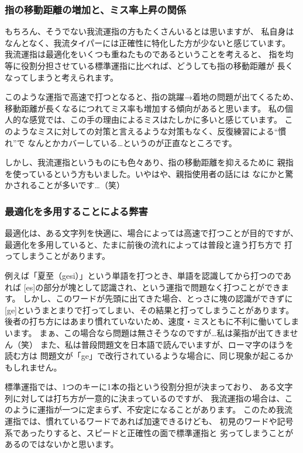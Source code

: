 \subsubsection*{指の移動距離の増加と、ミス率上昇の関係}

もちろん、そうでない我流運指の方もたくさんいるとは思いますが、
私自身はなんとなく、我流タイパーには正確性に特化した方が少ないと感じています。
我流運指は最適化をいくつも重ねたものであるということを考えると、
指を均等に役割分担させている標準運指に比べれば、どうしても指の移動距離が
長くなってしまうと考えられます。

このような運指で高速で打つとなると、指の跳躍→着地の問題が出てくるため、
移動距離が長くなるにつれてミス率も増加する傾向があると思います。
私の個人的な感覚では、この手の理由によるミスはたしかに多いと感じています。
このようなミスに対しての対策と言えるような対策もなく、反復練習による“慣れ”で
なんとかカバーしている…というのが正直なところです。


しかし、我流運指というものにも色々あり、指の移動距離を抑えるために
親指を使っているという方もいました。いやはや、親指使用者の話には
なにかと驚かされることが多いです…（笑）


\subsubsection*{最適化を多用することによる弊害}

最適化は、ある文字列を快適に、場合によっては高速で打つことが目的ですが、
最適化を多用していると、たまに前後の流れによっては普段と違う打ち方で
打ってしまうことがあります。

例えば「夏至（gesi）」という単語を打つとき、単語を認識してから打つのであれば
[es]の部分が塊として認識され、という運指で問題なく打つことができます。
しかし、このワードが先頭に出てきた場合、とっさに塊の認識ができずに
[ge]というまとまりで打ってしまい、その結果と打ってしまうことがあります。
後者の打ち方にはあまり慣れていないため、速度・ミスともに不利に働いてしまいます。
まぁ、この場合なら問題は無さそうなのですが…私は薬指が出てきません（笑）
また、私は普段問題文を日本語で読んでいますが、ローマ字のほうを読む方は
問題文が「ge」で改行されているような場合に、同じ現象が起こるかもしれません。


標準運指では、1つのキーに1本の指という役割分担が決まっており、
ある文字列に対しては打ち方が一意的に決まっているのですが、
我流運指の場合は、このように運指が一つに定まらず、不安定になることがあります。
このため我流運指では、慣れているワードであれば加速できるけども、
初見のワードや記号系であったりすると、スピードと正確性の面で標準運指と
劣ってしまうことがあるのではないかと思います。



